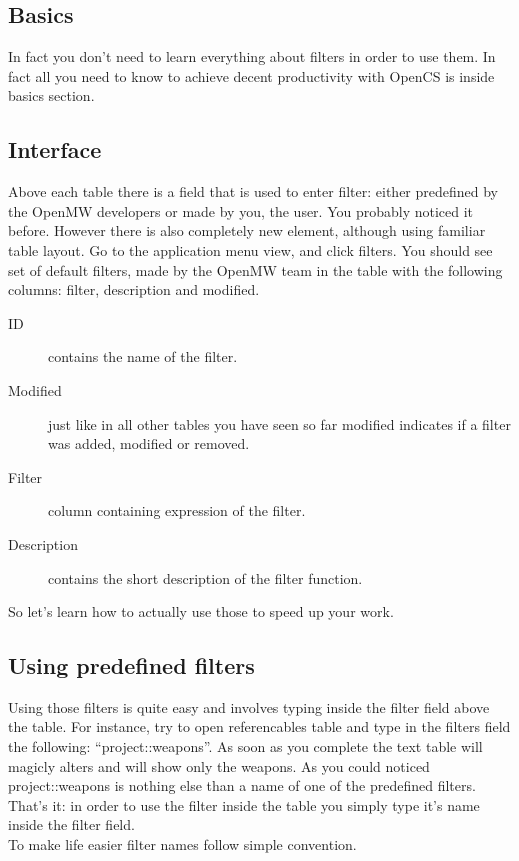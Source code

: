 \subsection{Basics}
In fact you don't need to learn everything about filters in order to use them. In fact all you need to know to achieve decent productivity with OpenCS is inside basics section.

\subsection{Interface}
Above each table there is a field that is used to enter filter: either predefined by the OpenMW developers or made by you, the user. You probably noticed it before. However there is also completely new element, although using familiar table layout. Go to the application menu view, and click filters. You should see set of default filters, made by the OpenMW team in the table with the following columns: filter, description and modified.

\begin{description}
 \item[ID] contains the name of the filter.
 \item[Modified] just like in all other tables you have seen so far modified indicates if a filter was added, modified or removed.
 \item[Filter] column containing expression of the filter.
 \item[Description] contains the short description of the filter function.
\end{description}

So let's learn how to actually use those to speed up your work.
\subsection{Using predefined filters}
Using those filters is quite easy and involves typing inside the filter field above the table. For instance, try to open referencables table and type in the filters field the following: ``project::weapons''. As soon as you complete the text table will magicly alters and will show only the weapons. As you could noticed project::weapons is nothing else than a name of one of the predefined filters. That's it: in order to use the filter inside the table you simply type it's name inside the filter field.\\
To make life easier filter names follow simple convention. 

